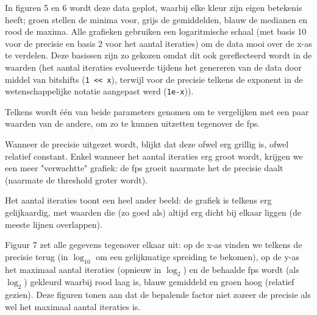 \documentclass{article}
\begin{document}
In figuren 5 en 6 wordt deze data geplot, waarbij elke kleur zijn eigen betekenis heeft; groen stellen de minima voor, grijs de gemiddelden, blauw de medianen en rood de maxima. Alle grafieken gebruiken een logaritmische schaal (met basis 10 voor de precisie en basis 2 voor het aantal iteraties) om de data mooi over de x-as te verdelen. Deze basissen zijn zo gekozen omdat dit ook gereflecteerd wordt in de waarden (het aantal iteraties evolueerde tijdens het genereren van de data door middel van bitshifts (\verb|1 << x|), terwijl voor de precisie telkens de exponent in de wetenschappelijke notatie aangepast werd (\verb|1e-x|)).

Telkens wordt \'e\'en van beide parameters genomen om te vergelijken met een paar waarden van de andere, om zo te kunnen uitzetten tegenover de fps.

Wanneer de precisie uitgezet wordt, blijkt dat deze ofwel erg grillig is, ofwel relatief constant. Enkel wanneer het aantal iteraties erg groot wordt, krijgen we een meer "verwachtte" grafiek: de fps groeit naarmate het de precisie daalt (naarmate de threshold groter wordt).

Het aantal iteraties toont een heel ander beeld: de grafiek is telkens erg gelijkaardig, met waarden die (zo goed als) altijd erg dicht bij elkaar liggen (de meeste lijnen overlappen).

Figuur 7 zet alle gegevens tegenover elkaar uit: op de x-as vinden we telkens de precisie terug (in $\log_{10}$ om een gelijkmatige spreiding te bekomen), op de y-as het maximaal aantal iteraties (opnieuw in $\log_2$) en de behaalde fps wordt (als $\log_2$) gekleurd waarbij rood laag is, blauw gemiddeld en groen hoog (relatief gezien). Deze figuren tonen aan dat de bepalende factor niet zozeer de precisie als wel het maximaal aantal iteraties is.
\end{document}
